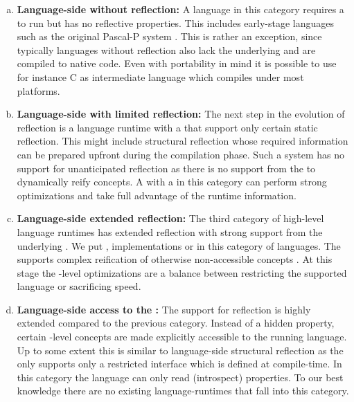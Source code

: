 \begin{enumerate}[a)]
\item \textbf{Language-side without reflection:}
	A language in this category requires a \VM to run but has no reflective properties.
	This includes early-stage languages such as the original Pascal-P system \cite{Nels79a}.
	This is rather an exception, since typically languages without reflection also lack the underlying \VM and are compiled to native code.
	Even with portability in mind it is possible to use for instance C as intermediate language which compiles under most platforms.
	
\item \textbf{Language-side with limited reflection:}
	The next step in the evolution of reflection is a language runtime with a \VM that support only certain static reflection.
	This might include structural reflection whose required information can be prepared upfront during the compilation phase.
	Such a system has no support for unanticipated reflection as there is no support from the \VM to dynamically reify concepts.
	A \VM with a \JIT in this category can perform strong optimizations and take full advantage of the runtime information.
	
\item \textbf{Language-side extended reflection:}
	The third category of high-level language runtimes has extended reflection with strong support from the underlying \VM.
	We put \PH, \ST implementations or \Self in this category of languages.
	The \VM supports complex reification of otherwise non-accessible concepts .
	At this stage the \VM-level optimizations are a balance between restricting the supported language or sacrificing speed.
	
\item \textbf{Language-side access to the \VM:}
	The \VM support for reflection is highly extended compared to the previous category.
	Instead of a hidden property, certain \VM-level concepts are made explicitly accessible to the running language.
	Up to some extent this is similar to language-side structural reflection as the \VM only supports only a restricted interface which is defined at compile-time.
	In this category the language can only read (introspect) \VM properties.
	To our best knowledge there are no existing language-runtimes that fall into this category.


\end{enumerate}
